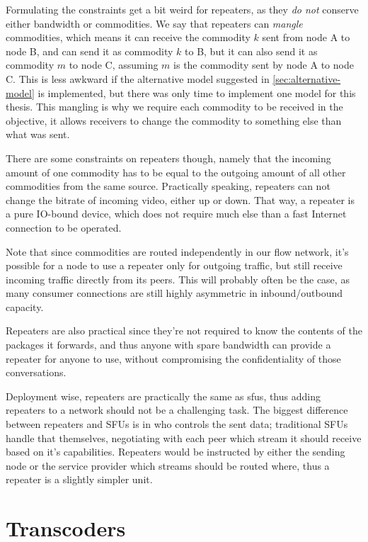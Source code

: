Formulating the constraints get a bit weird for repeaters, as they \emph{do not} conserve either bandwidth or commodities. We say that repeaters can \emph{mangle} commodities, which means it can receive the commodity $k$ sent from node A to node B, and can send it as commodity $k$ to B, but it can also send it as commodity $m$ to node C, assuming $m$ is the commodity sent by node A to node C. This is less awkward if the alternative model suggested in \autoref{sec:alternative-model} is implemented, but there was only time to implement one model for this thesis. This mangling is why we require each commodity to be received in the objective, it allows receivers to change the commodity to something else than what was sent.

There are some constraints on repeaters though, namely that the incoming amount of one commodity has to be equal to the outgoing amount of all other commodities from the same source. Practically speaking, repeaters can not change the bitrate of incoming video, either up or down. That way, a repeater is a pure IO-bound device, which does not require much else than a fast Internet connection to be operated.

Note that since commodities are routed independently in our flow network, it's possible for a node to use a repeater only for outgoing traffic, but still receive incoming traffic directly from its peers. This will probably often be the case, as many consumer connections are still highly asymmetric in inbound/outbound capacity.

Repeaters are also practical since they're not required to know the contents of the packages it forwards, and thus anyone with spare bandwidth can provide a repeater for anyone to use, without compromising the confidentiality of those conversations.

Deployment wise, repeaters are practically the same as \glspl{sfu}, thus adding repeaters to a network should not be a challenging task. The biggest difference between repeaters and SFUs is in who controls the sent data; traditional SFUs handle that themselves, negotiating with each peer which stream it should receive based on it's capabilities. Repeaters would be instructed by either the sending node or the service provider which streams should be routed where, thus a repeater is a slightly simpler unit.


\section{Transcoders}

